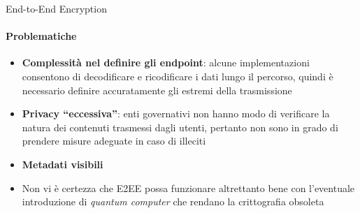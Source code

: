 \begin{frame}{End-to-End Encryption} 
    \framesubtitle{Problematiche}
    \begin{itemize}
        \item \textbf{Complessità nel definire gli endpoint}: alcune implementazioni consentono di decodificare e ricodificare i dati lungo il percorso, quindi è necessario definire accuratamente gli estremi della trasmissione\pause
        \item \textbf{Privacy ``eccessiva''}: enti governativi non hanno modo di verificare la natura dei contenuti trasmessi dagli utenti, pertanto non sono in grado di prendere misure adeguate in caso di illeciti\pause
        \item \textbf{Metadati visibili}\pause
        \item Non vi è certezza che E2EE possa funzionare altrettanto bene con l'eventuale introduzione di \textit{quantum computer} che rendano la crittografia obsoleta
    \end{itemize}
    \cite{techTarget}
\end{frame}